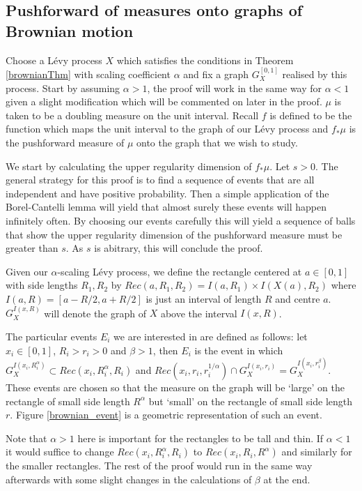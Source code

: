 \documentclass[12pt]{amsart}
\numberwithin{equation}{section}
\begin{document}
\subsection{Pushforward of measures onto graphs of Brownian motion}


Choose a L\'evy process $X$ which satisfies the conditions in Theorem \ref{brownianThm} with scaling coefficient $\alpha$ and fix a graph $G_X^{[0,1]}$ realised by this process. Start by assuming $\alpha > 1$, the proof will work in the same way for $\alpha < 1$ given a slight modification which will be commented on later in the proof. $\mu$ is taken to be a doubling measure on the unit interval. Recall $f$ is defined to be the function which maps the unit interval to the graph of our L\'evy process and $f_*\mu$ is the pushforward measure of $\mu$ onto the graph that we wish to study. 

We start by calculating the upper regularity dimension of $f_*\mu$. Let $s>0$. The general strategy for this proof is to find a sequence of events that are all independent and have positive probability. Then a simple application of the Borel-Cantelli lemma will yield that almost surely these events will happen infinitely often. By choosing our events carefully this will yield a sequence of balls that show the upper regularity dimension of the pushforward measure must be greater than $s$. As $s$ is abitrary, this will conclude the proof.

Given our $\alpha$-scaling L\'evy process, we define the rectangle centered at $a\in [0,1]$ with side lengths $R_1,R_2$ by $Rec(a,R_1,R_2) = I(a,R_1) \times I(X(a),R_2)$ where $I(a,R) = [a-R/2,a+R/2]$ is just an interval of length $R$ and centre $a$. $G_X^{I(x,R)}$ will denote the graph of $X$ above the interval $I(x,R)$.

The particular events $E_i$ we are interested in are defined as follows: let $x_i \in [0,1]$, $R_i > r_i> 0$ and $\beta > 1$, then $E_i$ is the event in which $G_X^{I(x_i,R_i^{\alpha})} \subset Rec(x_i,R_i^{\alpha},R_i)$ and $Rec(x_i, r_i, r_i^{1/\alpha}) \cap G_X^{I(x_i,r_i)} = G_X^{I(x_i,r_i^{\beta})}$. These events are chosen so that the measure on the graph will be `large' on the rectangle of small side length $R^{\alpha}$ but `small' on the rectangle of small side length $r$. Figure \ref{brownian_event} is a geometric representation of such an event.  

Note that $\alpha>1$ here is important for the rectangles to be tall and thin. If $\alpha < 1$ it would suffice to change $Rec(x_i,R_i^{\alpha}, R_i)$ to $Rec(x_i, R_i, R^{\alpha})$ and similarly for the smaller rectangles. The rest of the proof would run in the same way afterwards with some slight changes in the calculations of $\beta$ at the end.
\end{document}
